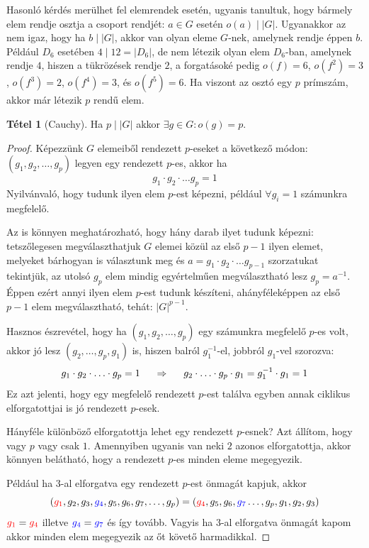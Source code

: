 \documentclass[12pt]{book}
\theoremstyle{plain} %
\theoremstyle{definition} %
\newtheorem{theo/}{Tétel}[section]
\newenvironment{theo}
  {\renewcommand{\qedsymbol}{$\clubsuit$}%
   \pushQED{\qed}\begin{theo/}}
  {\popQED\end{theo/}}
\theoremstyle{remark}
\renewcommand\qedsymbol{$\blacksquare$}
\numberwithin{equation}{section}  %
\begin{document}
	Hasonló kérdés merülhet fel elemrendek esetén, ugyanis tanultuk, hogy bármely elem rendje osztja a csoport rendjét: $a\in G$ esetén $o(a)\mid |G|$. Ugyanakkor az nem igaz, hogy ha $b\mid |G|$, akkor van olyan eleme $G$-nek, amelynek rendje éppen $b$. Például $D_6$ esetében $4\mid 12 = |D_6|$, de nem létezik olyan elem $D_6$-ban, amelynek rendje $4$, hiszen a tükrözések rendje $2$, a forgatásoké pedig $o(f) = 6$, $o(f^2) = 3$, $o(f^3) = 2$, $o(f^4) = 3$, és $o(f^5) = 6$. Ha viszont az osztó egy $p$ prímszám, akkor már létezik $p$ rendű elem.
	
	\begin{theo}[Cauchy]
		Ha $p\mid |G|$ akkor $\exists g\in G\colon o(g) = p$.
	\end{theo}

	\begin{proof}
		Képezzünk $G$ elemeiből rendezett $p$-eseket a következő módon: $(g_1,g_2,\ldots,g_p)$ legyen egy rendezett $p$-es, akkor ha
		\[ g_1 \cdot g_2 \cdot \ldots g_p = 1  \]
		Nyilvánvaló, hogy tudunk ilyen elem $p$-est képezni, például $\forall g_i = 1$ számunkra megfelelő.
		
		Az is könnyen meghatározható, hogy hány darab ilyet tudunk képezni: tetszőlegesen megválaszthatjuk $G$ elemei közül az első $p-1$ ilyen elemet, melyeket bárhogyan is választunk meg és $a = g_1 \cdot g_2 \cdot \ldots g_{p-1}$ szorzatukat tekintjük, az utolsó $g_p$ elem mindig egyértelműen megválasztható lesz $g_p = a^{-1}$. Éppen ezért annyi ilyen elem $p$-est tudunk készíteni, ahányféleképpen az első $p-1$ elem megválasztható, tehát: $|G|^{p-1}$.
		
		Hasznos észrevétel, hogy ha $(g_1,g_2,\ldots, g_p)$ egy számunkra megfelelő $p$-es volt, akkor jó lesz $(g_2,\ldots, g_p, g_1)$ is, hiszen balról $g_1^{-1}$-el, jobbról $g_1$-vel szorozva:
		\[ g_1\cdot g_2\cdot \ldots \cdot g_p = 1 \hspace{5mm} \Rightarrow \hspace{5mm} g_2 \cdot \ldots \cdot g_p \cdot g_1 = g_1^{-1} \cdot g_1 = 1  \]
		Ez azt jelenti, hogy egy megfelelő rendezett $p$-est találva egyben annak ciklikus elforgatottjai is jó rendezett $p$-esek. 
		
		Hányféle különböző elforgatottja lehet egy rendezett $p$-esnek? Azt állítom, hogy vagy $p$ vagy csak $1$. Amennyiben ugyanis van neki $2$ azonos elforgatottja, akkor könnyen belátható, hogy a rendezett $p$-es minden eleme megegyezik.
		
		Például ha $3$-al elforgatva egy rendezett $p$-est önmagát kapjuk, akkor
		\[ (\color{red} g_1 \color{black}, g_2, g_3, \color{blue} g_4 \color{black}, g_5, g_6, g_7, \ldots, g_p) = (\color{red} g_4 \color{black}, g_5, g_6, \color{blue} g_7 \color{black} \ldots, g_p, g_1, g_2, g_3)  \]
		$\color{red} g_1 \color{black} = \color{red} g_4 \color{black}$ illetve $\color{blue} g_4 \color{black} = \color{blue} g_7 \color{black}$ és így tovább. Vagyis ha $3$-al elforgatva önmagát kapom akkor minden elem megegyezik az őt követő harmadikkal.
		

\end{proof}
\end{document}
